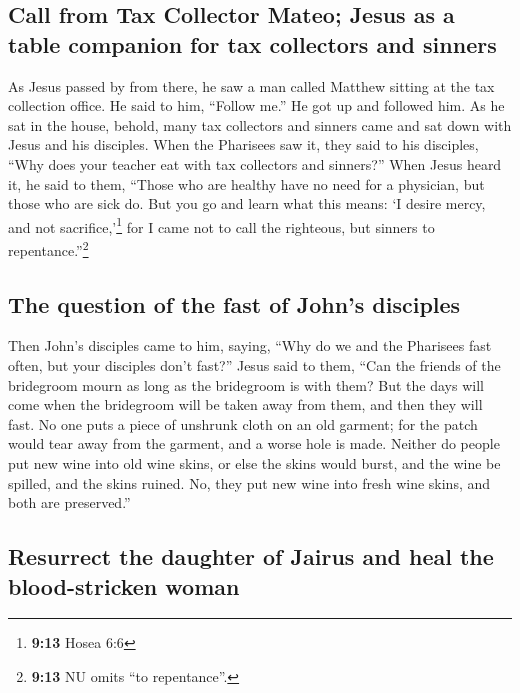 \hypertarget{call-from-tax-collector-mateo-jesus-as-a-table-companion-for-tax-collectors-and-sinners}{%
\subsection{Call from Tax Collector Mateo; Jesus as a table companion
for tax collectors and
sinners}\label{call-from-tax-collector-mateo-jesus-as-a-table-companion-for-tax-collectors-and-sinners}}

 As Jesus passed by from there, he saw a man called
Matthew sitting at the tax collection office. He said to him, ``Follow
me.'' He got up and followed him.  As he sat in the
house, behold, many tax collectors and sinners came and sat down with
Jesus and his disciples.  When the Pharisees saw it, they
said to his disciples, ``Why does your teacher eat with tax collectors
and sinners?''  When Jesus heard it, he said to them,
``Those who are healthy have no need for a physician, but those who are
sick do.  But you go and learn what this means: `I desire
mercy, and not sacrifice,'\footnote{\textbf{9:13} Hosea 6:6} for I came
not to call the righteous, but sinners to repentance.''\footnote{\textbf{9:13}
  NU omits ``to repentance''.}

\hypertarget{the-question-of-the-fast-of-johns-disciples}{%
\subsection{The question of the fast of John's
disciples}\label{the-question-of-the-fast-of-johns-disciples}}

 Then John's disciples came to him, saying, ``Why do we
and the Pharisees fast often, but your disciples don't fast?''
 Jesus said to them, ``Can the friends of the bridegroom
mourn as long as the bridegroom is with them? But the days will come
when the bridegroom will be taken away from them, and then they will
fast.  No one puts a piece of unshrunk cloth on an old
garment; for the patch would tear away from the garment, and a worse
hole is made.  Neither do people put new wine into old
wine skins, or else the skins would burst, and the wine be spilled, and
the skins ruined. No, they put new wine into fresh wine skins, and both
are preserved.''

\hypertarget{resurrect-the-daughter-of-jairus-and-heal-the-blood-stricken-woman}{%
\subsection{Resurrect the daughter of Jairus and heal the blood-stricken
woman}\label{resurrect-the-daughter-of-jairus-and-heal-the-blood-stricken-woman}}

